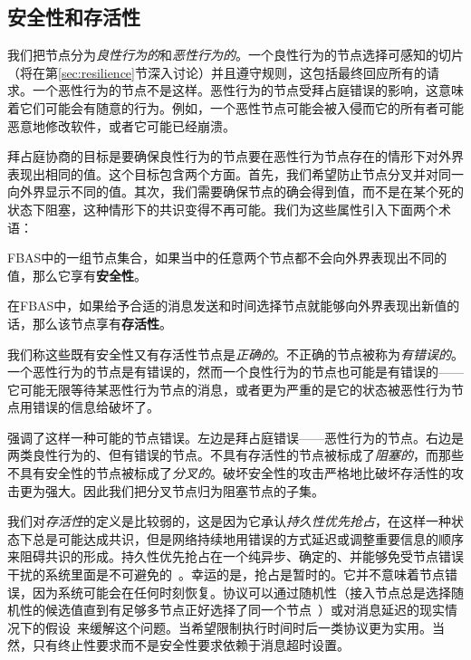 \subsection{安全性和存活性}\label{sec:fba-safe-live}

我们把节点分为\textit{良性行为的}和\textit{恶性行为的}。一个良性行为的节点选择可感知的{\quorum}切片（将在第\ref{sec:resilience}节深入讨论）并且遵守规则，这包括最终回应所有的请求。一个恶性行为的节点不是这样。恶性行为的节点受拜占庭错误的影响，这意味着它们可能会有随意的行为。例如，一个恶性节点可能会被入侵而它的所有者可能恶意地修改软件，或者它可能已经崩溃。

拜占庭协商的目标是要确保良性行为的节点要在恶性行为节点存在的情形下对外界表现出相同的值。这个目标包含两个方面。首先，我们希望防止节点分叉并对同一{\slot}向外界显示不同的值。其次，我们需要确保节点的确会得到值，而不是在某个死的状态下阻塞，这种情形下的共识变得不再可能。我们为这些属性引入下面两个术语：

\begin{definition}[安全性]
	FBAS中的一组节点集合，如果当中的任意两个节点都不会向外界表现出不同的值，那么它享有{\textbf{安全性}}。
\end{definition}

\begin{definition}[存活性]
	在FBAS中，如果给予合适的消息发送和时间选择节点就能够向外界表现出新值的话，那么该节点享有{\textbf{存活性}}。
\end{definition}

我们称这些既有安全性又有存活性节点是\textit{正确的}。不正确的节点被称为{\textit{有错误的}}。一个恶性行为的节点是有错误的，然而一个良性行为的节点也可能是有错误的——它可能无限等待某恶性行为节点的消息，或者更为严重的是它的状态被恶性行为节点用错误的信息给破坏了。

强调了这样一种可能的节点错误。左边是拜占庭错误——恶性行为的节点。右边是两类良性行为的、但有错误的节点。不具有存活性的节点被标成了\textit{阻塞的}，而那些不具有安全性的节点被标成了\textit{分叉的}。破坏安全性的攻击严格地比破坏存活性的攻击更为强大。因此我们把分叉节点归为阻塞节点的子集。

我们对\textit{存活性}的定义是比较弱的，这是因为它承认\textit{持久性优先抢占}，在这样一种状态下总是可能达成共识，但是网络持续地用错误的方式延迟或调整重要信息的顺序来阻碍共识的形成。持久性优先抢占在一个纯异步、确定的、并能够免受节点错误干扰的系统里面是不可避免的~\cite{Fischer:1985:IDC:3149.214121}。幸运的是，抢占是暂时的。它并不意味着节点错误，因为系统可能会在任何时刻恢复。协议可以通过随机性（接入节点总是选择随机性的候选值直到有足够多节点正好选择了同一个节点~\cite{Ben-Or:1983:AFC:800221.806707,Bracha:1985:ACB:4221.214134}）或对消息延迟的现实情况下的假设~\cite{Dwork:1988:CPP:42282.42283}来缓解这个问题。当希望限制执行时间时后一类协议更为实用。当然，只有终止性要求而不是安全性要求依赖于消息超时设置。


